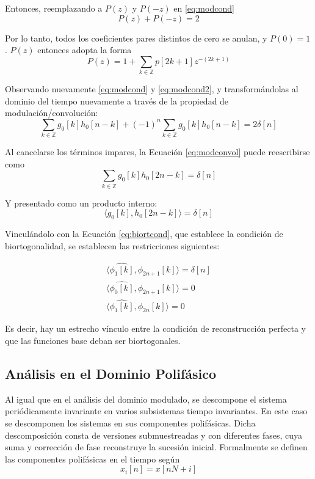 	Entonces, reemplazando a $P(z)$ y $P(-z)$ en  \eqref{eq:modcond}
		\begin{equation}
			P(z)+P(-z)=2
		\end{equation}
	
	Por lo tanto, todos los coeficientes pares distintos de cero se anulan, y $P(0)=1$. $P(z)$ entonces adopta la forma
		\begin{equation}
			P(z)=1+\sum_{k\in\mathbb{Z}} p[2k+1]z^{-(2k+1)}
		\end{equation}
	
	Observando nuevamente \eqref{eq:modcond} y \eqref{eq:modcond2}, y transformándolas al dominio del tiempo nuevamente a través de la propiedad de modulación/convolución: 
		\begin{equation}
			\sum_{k\in\mathbb{Z}}g_0[k]h_0[n-k]+(-1)^n\sum_{k\in\mathbb{Z}}g_0[k]h_0[n-k]=2\delta[n]
			\label{eq:modconvol}
		\end{equation}

	Al cancelarse los términos impares, la Ecuación \eqref{eq:modconvol} puede reescribirse como
		\begin{equation}
			\sum_{k\in\mathbb{Z}}g_0[k]h_0[2n-k]=\delta[n]
		\end{equation}

	Y presentado como un producto interno:
		\begin{equation}
			\langle g_0[k],h_0[2n-k] \rangle=\delta[n]
		\end{equation}

	Vinculándolo con la Ecuación \eqref{eq:biortcond}, que establece la condición de biortogonalidad, se establecen las restricciones siguientes:

	\begin{align}
		\langle \hat{\phi_1[k]},\phi_{2n+1}[k] \rangle = \delta[n]	\\
		\langle \hat{\phi_0[k]},\phi_{2n+1}[k]\rangle	= 0	\\
		\langle \hat{\phi_1[k]},\phi_{2n}[k]\rangle = 0
	\end{align}

	Es decir, hay un estrecho vínculo entre la condición de reconstrucción perfecta y que las funciones base deban ser biortogonales.

\subsection{Análisis en el Dominio Polifásico}

	Al igual que en el análisis del dominio modulado, se descompone el sistema periódicamente 
	invariante en varios subsistemas tiempo invariantes. En este caso se descomponen los sistemas en sus componentes polifásicas. 
	Dicha descomposición consta de versiones submuestreadas y con diferentes fases, cuya suma y corrección de fase reconstruye la sucesión inicial.
	Formalmente se definen las componentes polifásicas en el tiempo según
		\begin{equation}
			x_i[n] = x[nN+i]
			\label{eq:poly_comp}
		\end{equation}
		
